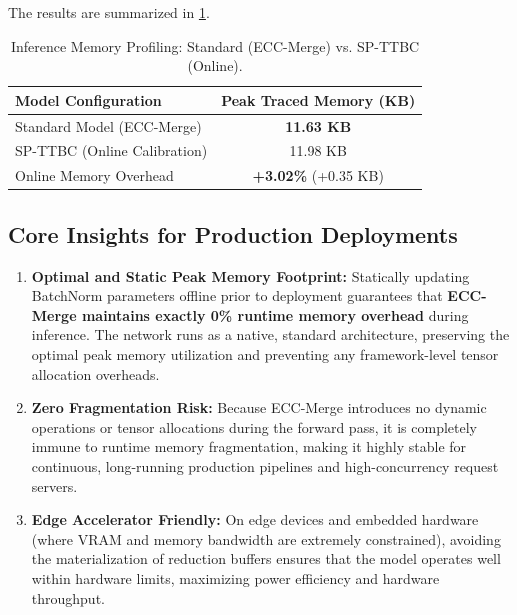 \documentclass{article}
\theoremstyle{plain}
\theoremstyle{definition}
\theoremstyle{remark}
\begin{document}
The results are summarized in \cref{tab:memory_profile}.

\begin{table}[h]
\caption{Inference Memory Profiling: Standard (ECC-Merge) vs. SP-TTBC (Online).}
\label{tab:memory_profile}
\vskip 0.15in
\begin{center}
\begin{small}
\begin{sc}
\begin{tabular}{lc}
\toprule
Model Configuration & Peak Traced Memory (KB) \\
\midrule
Standard Model (ECC-Merge) & \textbf{11.63 KB} \\
SP-TTBC (Online Calibration) & 11.98 KB \\
\midrule
Online Memory Overhead & \textbf{+3.02\%} (+0.35 KB) \\
\bottomrule
\end{tabular}
\end{sc}
\end{small}
\end{center}
\vskip -0.1in
\end{table}

\subsection{Core Insights for Production Deployments}
\begin{enumerate}
    \item \textbf{Optimal and Static Peak Memory Footprint:} Statically updating BatchNorm parameters offline prior to deployment guarantees that \textbf{ECC-Merge maintains exactly 0\% runtime memory overhead} during inference. The network runs as a native, standard architecture, preserving the optimal peak memory utilization and preventing any framework-level tensor allocation overheads.
    \item \textbf{Zero Fragmentation Risk:} Because ECC-Merge introduces no dynamic operations or tensor allocations during the forward pass, it is completely immune to runtime memory fragmentation, making it highly stable for continuous, long-running production pipelines and high-concurrency request servers.
    \item \textbf{Edge Accelerator Friendly:} On edge devices and embedded hardware (where VRAM and memory bandwidth are extremely constrained), avoiding the materialization of reduction buffers ensures that the model operates well within hardware limits, maximizing power efficiency and hardware throughput.
\end{enumerate}
\end{document}
